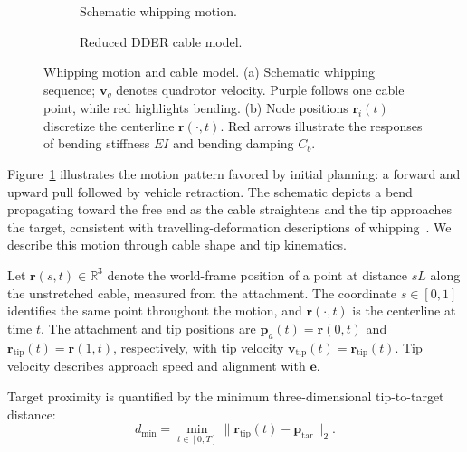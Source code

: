 \documentclass[letterpaper, 10 pt, conference]{ieeeconf}
\begin{document}
\begin{figure}[t]
    \centering
    \begin{subfigure}[t]{0.54\textwidth}
        \centering
        \resizebox{\linewidth}{!}{%
            
        }
        \caption{Schematic whipping motion.}
        \label{fig:problem_whipping}
    \end{subfigure}
    \hfill
    \begin{subfigure}[t]{0.45\textwidth}
        \centering
        \resizebox{\linewidth}{!}{%
            
        }
        \caption{Reduced DDER cable model.}
        \label{fig:problem_dder}
    \end{subfigure}
    \caption{Whipping motion and cable model.
    (a) Schematic whipping sequence; $\mathbf v_q$ denotes
    quadrotor velocity. Purple follows one cable point, while
    red highlights bending.
    (b) Node positions $\mathbf r_i(t)$ discretize the centerline
    $\mathbf r(\cdot,t)$. Red arrows illustrate the responses of
    bending stiffness $EI$ and bending damping $C_b$.}
    \label{fig:problem_statement}
\end{figure}

Figure~\ref{fig:problem_whipping} illustrates the motion pattern
favored by initial planning: a forward and upward pull followed
by vehicle retraction. The schematic depicts a bend propagating
toward the free end as the cable straightens and the tip
approaches the target, consistent with travelling-deformation
descriptions of whipping~\cite{MCMILLEN2003192}. We describe this
motion through cable shape and tip kinematics.

Let $\mathbf r(s,t)\in\mathbb R^3$ denote the world-frame position
of a point at distance $sL$ along the unstretched cable, measured
from the attachment. The coordinate $s\in[0,1]$ identifies the same
point throughout the motion, and $\mathbf r(\cdot,t)$ is the
centerline at time $t$.
The attachment and tip positions are
$\mathbf p_a(t)=\mathbf r(0,t)$ and
$\mathbf r_{\mathrm{tip}}(t)=\mathbf r(1,t)$, respectively,
with tip velocity
$\mathbf v_{\mathrm{tip}}(t)=\dot{\mathbf r}_{\mathrm{tip}}(t)$.
Tip velocity describes approach speed and alignment with
$\mathbf e$.

Target proximity is quantified by the minimum
three-dimensional tip-to-target distance:
\begin{equation}
d_{\min}
=\min_{t\in[0,T]}
\|\mathbf r_{\mathrm{tip}}(t)-\mathbf p_{\mathrm{tar}}\|_2.
\label{eq:target_distance}
\end{equation}
\end{document}

